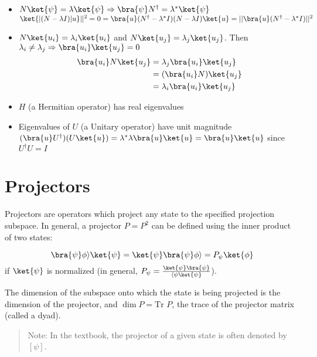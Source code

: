 \documentclass[a4paper,twoside,master.tex]{subfiles}
\begin{document}
\begin{itemize}
\item $N\ket{\psi} = \lambda\ket{\psi}\Rightarrow\bra{\psi}N^\dagger=\lambda^*\ket{\psi}$
    \subitem $\ket{|(N-\lambda I)|u}||^2 = 0 =\bra{ u}(N^\dagger - \lambda^* I)(N-\lambda I)\ket{u} = ||\bra{ u}(N^\dagger - \lambda^* I)||^2$
\item $N\ket{u_i} = \lambda_i\ket{u_i}$ and $N\ket{u_j} = \lambda_j\ket{u_j}$. Then $\lambda_i\neq\lambda_j\Rightarrow\bra{ u_i}\ket{ u_j} = 0$
    \subitem
        \begin{align}
            \bra{u_i} N\ket{ u_j} &= \lambda_j\bra{ u_i}\ket{u_j}\\
            &= (\bra{u_i}N)\ket{u_j}\\
            &= \lambda_i\bra{ u_i}\ket{u_j}
        \end{align}
\item $H$ (a Hermitian operator) has real eigenvalues
\item Eigenvalues of $U$ (a Unitary operator) have unit magnitude
    \subitem $(\bra{u} U^\dagger)(U\ket{u}) = \lambda^*\lambda\bra{u}\ket{u} = \bra{u} \ket{ u }$ since $U^\dagger U = I$
\end{itemize}



\section{Projectors}
\label{sec:projectors}

Projectors are operators which project any state to the specified
projection subspace. In general, a projector $P = P^2$ can be defined
using the inner product of two states:

\begin{equation}
\bra{\psi}\phi\rangle\ket{\psi} = \ket{\psi}\bra{\psi}\phi\rangle = P_\psi\ket{\phi}
\end{equation}
if $\ket{\psi}$ is normalized (in general,
$P_\psi = \frac{\ket{\psi}\bra{\psi}}{\langle\psi\ket{\psi}}$).

The dimension of the subspace onto which the state is being projected is
the dimension of the projector, and $\dim P = \text{Tr }P$, the trace
of the projector matrix (called a dyad).

\begin{quote}
Note: In the textbook, the projector of a given state is often denoted
by $[\psi]$.
\end{quote}
\end{document}
